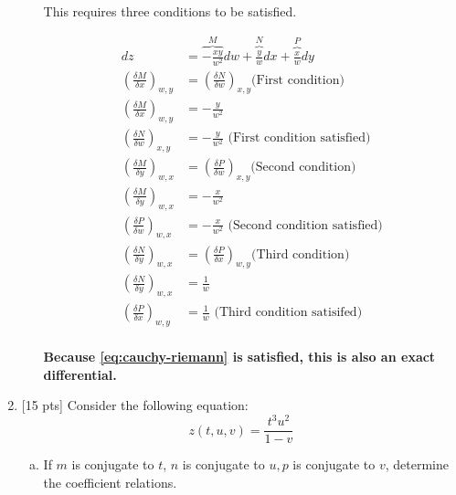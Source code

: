 \begin{enumerate}
\begin{enumerate}[(a)]
{          This requires three conditions to be satisfied.

          \begin{align*}
            dz &= \overbrace{-\frac{xy}{w^2}}^Mdw +
            \overbrace{\frac{y}{w}}^N dx + \overbrace{\frac{x}{w}}^Pdy \\
            \left(\frac{\delta M}{\delta x}\right)_{w,y} &=
            \left(\frac{\delta N}{\delta w}\right)_{x,y} \text{
            (First condition)}\\
            \left(\frac{\delta M}{\delta x}\right)_{w,y} &=-\frac{y}{w^2} \\
            \left(\frac{\delta N}{\delta w}\right)_{x,y}
            &=-\frac{y}{w^2} \text{ (First condition satisfied)}\\
            \left(\frac{\delta M}{\delta y}\right)_{w,x} &=
            \left(\frac{\delta P}{\delta w}\right)_{x,y} \text{
            (Second condition)}\\
            \left(\frac{\delta M}{\delta y}\right)_{w,x} &= -\frac{x}{w^2} \\
            \left(\frac{\delta P}{\delta w}\right)_{w,x} &=
            -\frac{x}{w^2} \text{ (Second condition satisfied)}\\
            \left(\frac{\delta N}{\delta y}\right)_{w,x} &=
            \left(\frac{\delta P}{\delta x}\right)_{w,y} \text{
            (Third condition)}\\
            \left(\frac{\delta N}{\delta y}\right)_{w,x} &= \frac{1}{w} \\
            \left(\frac{\delta P}{\delta x}\right)_{w,y} &=
            \frac{1}{w} \text{ (Third condition satisifed)} \\
          \end{align*}

          \textbf{Because \cref{eq:cauchy-riemann} is satisfied, this
          is also an exact differential.}
        }

    \end{enumerate}

    \pagebreak

  \item {[15 pts]} Consider the following equation:
    \begin{equation*}
      z(t, u, v) = \frac{t^3 u^2}{1 - v}
    \end{equation*}
    \begin{enumerate}[(a)]
      \item If $m$ is conjugate to $t$, $n$ is conjugate to $u, p$ is
        conjugate to $v$, determine the coefficient relations.


\end{enumerate}
\end{enumerate}
